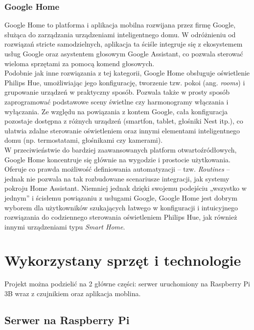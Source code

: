 \documentclass[12pt]{article}
\begin{document}
\subsubsection{Google Home}
Google Home to platforma i aplikacja mobilna rozwijana przez firmę Google, służąca do zarządzania urządzeniami inteligentnego domu.
W odróżnieniu od rozwiązań stricte samodzielnych, aplikacja ta ściśle integruje się z ekosystemem usług Google oraz asystentem głosowym Google Assistant,
co pozwala sterować wieloma sprzętami za pomocą komend głosowych.\\
Podobnie jak inne rozwiązania z tej kategorii, Google Home obsługuje oświetlenie Philips Hue, umożliwiając jego konfigurację, tworzenie tzw. pokoi (ang. \textit{rooms})
i grupowanie urządzeń w praktyczny sposób. Pozwala także w prosty sposób zaprogramować podstawowe sceny świetlne czy harmonogramy włączania i wyłączania.
Ze względu na powiązania z kontem Google, cała konfiguracja pozostaje dostępna z różnych urządzeń (smartfon, tablet, głośniki Nest itp.),
co ułatwia zdalne sterowanie oświetleniem oraz innymi elementami inteligentnego domu (np. termostatami, głośnikami czy kamerami).\\
W przeciwieństwie do bardziej zaawansowanych platform otwartoźródłowych, Google Home koncentruje się głównie na wygodzie i prostocie użytkowania.
Oferuje co prawda możliwość definiowania automatyzacji – tzw. \textit{Routines} – jednak nie pozwala na tak rozbudowane scenariusze integracji,
jak systemy pokroju Home Assistant. Niemniej jednak dzięki swojemu podejściu „wszystko w jednym” i ścisłemu powiązaniu z usługami Google,
Google Home jest dobrym wyborem dla użytkowników szukających łatwego w konfiguracji i intuicyjnego rozwiązania do codziennego sterowania oświetleniem Philips Hue,
jak również innymi urządzeniami typu \textit{Smart Home}.

\clearpage

\section{Wykorzystany sprzęt i technologie}
Projekt można podzielić na 2 główne części: serwer uruchomiony na Raspberry Pi 3B wraz z czujnikiem oraz aplikacja moblina.
\subsection{Serwer na Raspberry Pi}
\end{document}
